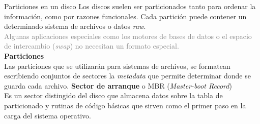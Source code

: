 \documentclass[aspectratio=169]{beamer}
\begin{document}
\begin{frame}{Particiones en un disco}
    Los discos suelen ser particionados tanto para ordenar la información, como por razones funcionales.
    Cada partición puede contener un determinado sistema de archivos o datos \emph{raw}.\\
    \bigskip
    \textcolor{gray}{Algunas aplicaciones especiales como los motores de bases de datos o el espacio de intercambio (\emph{swap}) no necesitan un formato especial.}\\
    \bigskip
    \textcolor{naranjauca}{\textbf{Particiones}}\\
    Las particiones que se utilizarán para sistemas de archivos, se formatean escribiendo conjuntos de sectores la \emph{metadata} que permite determinar donde se guarda cada archivo.
    \bigskip
    \textcolor{naranjauca}{\textbf{Sector de arranque}} o \textcolor{naranjauca}{MBR (\textit{Master-boot Record})}\\
    Es un sector distingido del disco que almacena datos sobre la tabla de particionado y rutinas de código básicas que sirven como el primer paso en la carga del sistema operativo.
\end{frame}

\end{document}
